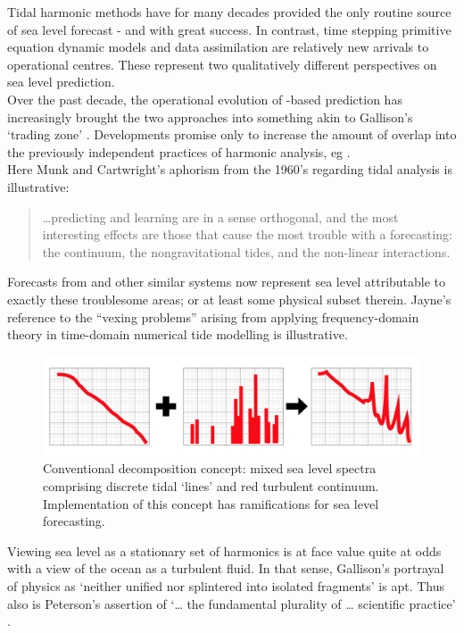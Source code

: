 Tidal harmonic methods have for many decades provided the only routine source of sea level forecast - and with great success.  
In contrast, time stepping primitive equation dynamic models and data assimilation are relatively new arrivals to operational centres.  
These represent two qualitatively different perspectives on sea level prediction.\\


Over the past decade, the operational evolution of \OGCM-based prediction has increasingly brought the two approaches into something akin to Gallison's `trading zone' \citep{Galison:1996uc}.
Developments promise only to increase the amount of overlap into the previously independent practices of harmonic analysis, eg \cite{Arbic:2010us}.\\
Here Munk and Cartwright's aphorism from the 1960's regarding tidal analysis is illustrative:
\begin{quote}
  \dots predicting and learning are in a sense orthogonal, and the most interesting effects are those that cause the most trouble with a forecasting: the continuum, the nongravitational tides, and the non-linear interactions.\citep{Munk:1966ts} 
\end{quote}
Forecasts from \BL{} and other similar systems now represent sea level attributable to exactly these troublesome areas; or at least some physical subset therein.
Jayne's reference to the ``vexing problems'' \citep[pp812]{Jayne:2001tr} arising from applying frequency-domain theory in time-domain numerical tide modelling is illustrative.

\begin{figure}[h]\centering
  \includegraphics[width=120mm]{figures/diagrams/spectra_cartoon_1.png}
  \caption{Conventional decomposition concept: mixed sea level spectra comprising discrete tidal `lines' and red turbulent continuum.  Implementation of this concept has ramifications for sea level forecasting.}
  \label{fig:SPECTRA_CARTOON}
\end{figure}

Viewing sea level as a stationary set of harmonics is at face value quite at odds with a view of the ocean as a turbulent fluid.   In that sense, Gallison's portrayal of physics as `neither unified nor splintered into isolated fragments' \citep[pp 782]{Galison:1987wh} is apt.  Thus also is Peterson's assertion of `\dots{} the fundamental plurality of \dots{} scientific practice' \cite{Petersen:2012tr}. 
